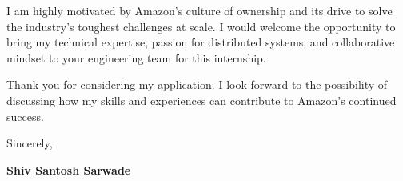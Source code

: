 \documentclass[a4paper,10pt]{article}
\begin{document}
I am highly motivated by Amazon's culture of ownership and its drive to solve the industry's toughest challenges at scale. I would welcome the opportunity to bring my technical expertise, passion for distributed systems, and collaborative mindset to your engineering team for this internship. 

Thank you for considering my application. I look forward to the possibility of discussing how my skills and experiences can contribute to Amazon's continued success.

Sincerely,

\vspace{1em}
\textbf{Shiv Santosh Sarwade}
\end{document}
